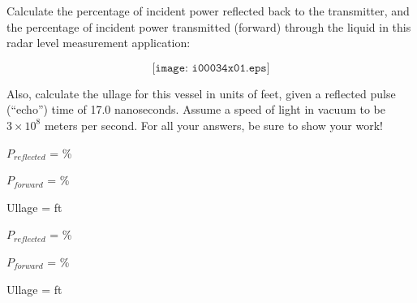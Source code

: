 

Calculate the percentage of incident power reflected back to the transmitter, and the percentage of incident power transmitted (forward) through the liquid in this radar level measurement application:

$$\texttt{[image: i00034x01.eps]}$$

Also, calculate the ullage for this vessel in units of feet, given a reflected pulse (``echo'') time of 17.0 nanoseconds.  Assume a speed of light in vacuum to be $3 \times 10^8$ meters per second.  For all your answers, be sure to show your work!

\vskip 30pt

$P_{reflected}$ = \underbar{\hskip 50pt} \%

\vskip 70pt

$P_{forward}$ = \underbar{\hskip 50pt} \%

\vskip 70pt

Ullage = \underbar{\hskip 50pt} ft







$P_{reflected}$ =  \%

\vskip 10pt

$P_{forward}$ =  \%

\vskip 10pt

Ullage =  ft











